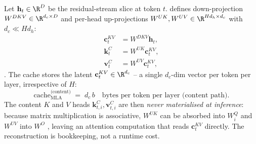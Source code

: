 Let $\mathbf{h}_t \in \R^{D}$ be the residual-stream slice at token
$t$.  defines down-projection $W^{DKV} \in \R^{d_c \times D}$ and
per-head up-projections
$W^{UK}, W^{UV} \in \R^{H d_h \times d_c}$ with $d_c \ll H d_h$:
\begin{align}
  \mathbf{c}_t^{KV} &= W^{DKV} \mathbf{h}_t,
   \tag{DSV2--Eq.~9} \label{eq:mla-cdkv} \\
  \mathbf{k}_t^C    &= W^{UK} \mathbf{c}_t^{KV},
   \tag{DSV2--Eq.~10} \label{eq:mla-kc} \\
  \mathbf{v}_t^C    &= W^{UV} \mathbf{c}_t^{KV},
   \tag{DSV2--Eq.~11} \label{eq:mla-vc}
\end{align}
\citep[\S 2.1.2, Eq.~9--11]{deepseek-v2}. The cache stores the latent
$\mathbf{c}_t^{KV} \in \R^{d_c}$ -- a single $d_c$-dim vector per token
per layer, irrespective of $H$:
\begin{equation}
  \mathrm{cache}_{\mathrm{MLA}}^{\text{(content)}}
  \;=\; d_c\,b
  \quad\text{bytes per token per layer (content path)}.
  \label{eq:mla-cache-content}
\end{equation}
The content $K$ and $V$ heads $\mathbf{k}_{t,i}^C, \mathbf{v}_{t,i}^C$
are then \emph{never materialised at inference}: because matrix
multiplication is associative, $W^{UK}$ can be absorbed into $W_i^Q$
and $W^{UV}$ into $W^O$ \citep[\S 2.1.2]{deepseek-v2}, leaving an
attention computation that reads $\mathbf{c}_t^{KV}$ directly. The
reconstruction is bookkeeping, not a runtime cost.

